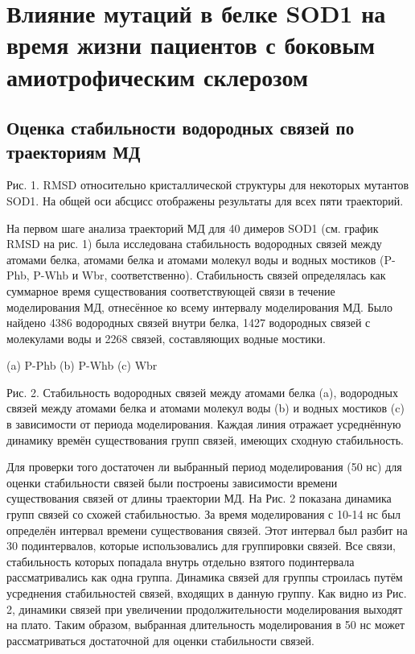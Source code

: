 \chapter{Влияние мутаций в белке SOD1 на время жизни пациентов с боковым амиотрофическим склерозом} \label{chapt3}

\section{Оценка стабильности водородных связей по траекториям МД} \label{sect_MD_hbonds}

Рис. 1. RMSD относительно кристаллической структуры для некоторых мутантов SOD1. На общей оси абсцисс отображены результаты для всех пяти траекторий.

На первом шаге анализа траекторий МД для 40 димеров SOD1 (см. график RMSD на рис. 1) была исследована стабильность  водородных связей между атомами белка, атомами белка и атомами молекул воды и водных мостиков (P-Phb, P-Whb и Wbr, соответственно). Стабильность связей определялась как суммарное время существования соответствующей связи в течение моделирования МД, отнесённое ко всему интервалу моделирования МД. Было найдено 4386 водородных связей внутри белка, 1427 водородных связей с молекулами воды и 2268 связей, составляющих водные мостики.

(a) P-Phb
(b) P-Whb
(c) Wbr

Рис. 2. Стабильность водородных связей между атомами белка (a), водородных связей между атомами белка и атомами молекул воды (b) и водных мостиков (c)  в зависимости от периода моделирования. Каждая линия отражает усреднённую динамику времён существования групп связей, имеющих сходную стабильность.

Для проверки того достаточен ли выбранный период моделирования (50 нс)  для оценки стабильности связей были построены зависимости времени существования связей от длины траектории МД. На Рис. 2 показана динамика групп связей со схожей стабильностью. За время моделирования с 10-14 нс был определён интервал времени существования связей. Этот интервал был разбит на 30 подинтервалов, которые использовались для группировки связей. Все связи, стабильность которых попадала внутрь отдельно взятого подинтервала рассматривались как одна группа. Динамика связей для группы строилась путём усреднения стабильностей связей, входящих в данную группу. Как видно из Рис. 2, динамики связей при увеличении продолжительности моделирования  выходят на плато. Таким образом, выбранная длительность моделирования в 50 нс может рассматриваться достаточной для оценки стабильности связей.

